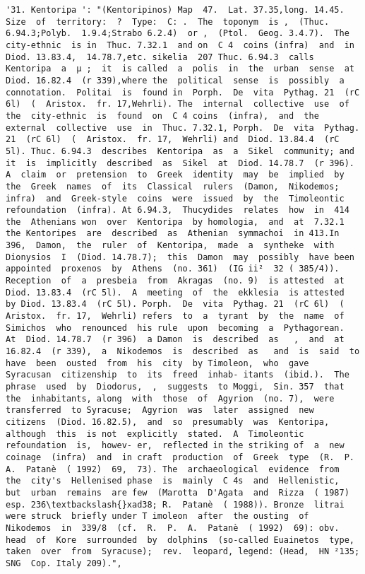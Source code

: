 \documentclass[11pt]{article}
\begin{document}
\begin{Verbatim}[commandchars=\\\{\}]
         '31. Kentoripa ': "(Kentoripinos) Map  47.  Lat. 37.35,long. 14.45.  Size  of  territory:  ?  Type:  C: .  The  toponym  is ,  (Thuc. 6.94.3;Polyb.  1.9.4;Strabo 6.2.4)  or ,  (Ptol.  Geog. 3.4.7).  The  city-ethnic  is in  Thuc. 7.32.1  and on  C 4  coins (infra)  and  in  Diod. 13.83.4,  14.78.7,etc. sikelia  207 Thuc. 6.94.3  calls  Kentoripa  a  µ ;  it  is called  a  polis  in  the  urban  sense  at  Diod. 16.82.4  (r 339),where the  political  sense  is  possibly  a  connotation.  Politai  is  found in  Porph.  De  vita  Pythag. 21  (rC 6l)  (  Aristox.  fr. 17,Wehrli). The  internal  collective  use  of  the  city-ethnic  is  found  on  C 4 coins  (infra),  and  the  external  collective  use  in  Thuc. 7.32.1, Porph.  De  vita  Pythag. 21  (rC 6l)  (  Aristox.  fr. 17,  Wehrli) and  Diod. 13.84.4  (rC 5l). Thuc. 6.94.3  describes  Kentoripa  as  a  Sikel  community; and  it  is  implicitly  described  as  Sikel  at  Diod. 14.78.7  (r 396). A  claim  or  pretension  to  Greek  identity  may  be  implied  by the  Greek  names  of  its  Classical  rulers  (Damon,  Nikodemos; infra)  and  Greek-style  coins  were  issued  by  the  Timoleontic refoundation  (infra). At 6.94.3,  Thucydides  relates  how  in  414  the  Athenians won  over  Kentoripa  by homologia,  and  at  7.32.1  the Kentoripes  are  described  as  Athenian  symmachoi  in 413.In 396,  Damon,  the  ruler  of  Kentoripa,  made  a  syntheke  with Dionysios  I  (Diod. 14.78.7);  this  Damon  may  possibly  have been  appointed  proxenos  by  Athens  (no. 361)  (IG ii²  32 ( 385/4)).  Reception  of  a  presbeia  from  Akragas  (no. 9)  is attested  at  Diod. 13.83.4  (rC 5l).  A  meeting  of  the  ekklesia  is attested  by Diod. 13.83.4  (rC 5l). Porph.  De  vita  Pythag. 21  (rC 6l)  (  Aristox.  fr. 17,  Wehrli) refers  to  a  tyrant  by  the  name  of  Simichos  who  renounced  his rule  upon  becoming  a  Pythagorean.  At  Diod. 14.78.7  (r 396)  a Damon  is  described  as   ,  and  at 16.82.4  (r 339),  a  Nikodemos  is  described  as   and  is  said  to  have  been  ousted  from  his  city  by Timoleon,  who  gave  Syracusan  citizenship  to  its  freed  inhab- itants  (ibid.).  The  phrase  used  by  Diodorus,  ,  suggests  to Moggi,  Sin. 357  that  the  inhabitants, along  with  those  of  Agyrion  (no. 7),  were transferred  to Syracuse;  Agyrion  was  later  assigned  new  citizens  (Diod. 16.82.5),  and  so  presumably  was  Kentoripa,  although  this  is not  explicitly  stated.  A  Timoleontic  refoundation  is,  howev- er,  reflected in the striking of  a  new  coinage  (infra)  and  in craft  production  of  Greek  type  (R.  P.  A.  Patanè  ( 1992)  69,  73). The  archaeological  evidence  from  the  city's  Hellenised phase  is  mainly  C 4s  and  Hellenistic,  but  urban  remains  are few  (Marotta  D'Agata  and  Rizza  ( 1987)  esp. 236\textbackslash{}xad38; R.  Patanè  ( 1988)). Bronze  litrai  were struck  briefly under T imoleon  after  the ousting  of  Nikodemos  in  339/8  (cf.  R.  P.  A.  Patanè  ( 1992)  69): obv.  head  of  Kore  surrounded  by  dolphins  (so-called Euainetos  type,  taken  over  from  Syracuse);  rev.  leopard, legend: (Head,  HN ²135;  SNG  Cop. Italy 209).",

\end{Verbatim}
\end{document}
